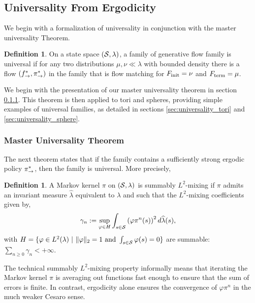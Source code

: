 \documentclass{article}
\theoremstyle{plain}
\theoremstyle{definition}
\newtheorem{definition}[theorem]{Definition}
\theoremstyle{remark}
\theoremstyle{fact}
\begin{document}
\subsection{Universality From Ergodicity}
\label{sec:universality}
We begin with a formalization of universality in conjunction with the master universality Theorem.
\begin{definition}
On a state space $(\mathcal S,\lambda)$, a family of generative flow family is 
universal if for any two distributions $\mu,\nu\ll \lambda$ with bounded density there is a flow $(f^*_{\rightarrow},\pi_{\rightarrow}^*)$ in the family that is flow matching for $F_{\mathrm{init}}=\nu$ and $F_{\mathrm{term}}=\mu$.
\end{definition}


We begin with the presentation of our master universality theorem in section \ref{sec:universality_master}. This theorem is then applied to tori and spheres, providing simple examples of universal families, as detailed in sections \ref{sec:universality_tori} and \ref{sec:universality_sphere}.


\subsubsection{Master Universality Theorem}
\label{sec:universality_master}
The next theorem states that if the family contains a sufficiently strong ergodic policy $\pi_{\rightarrow}^*$, then the family is universal. More precisely,
\begin{definition} A Markov kernel $\pi$ on $(\mathcal S,\lambda)$ is summably $L^2$-mixing if $\pi$ admits an invariant measure $\widehat \lambda$ equivalent to $\lambda$ and such that the $L^2$-mixing coefficients given by,
\begin{equation}
    \gamma_n := \sup_{\varphi \in H} \int_{s\in \mathcal S}
    \left(\varphi\pi^n(s)\right)^2 d\widehat \lambda(s), 
\end{equation}
with $H = \{\varphi \in L^2(\lambda)~|~\|\varphi\|_2 = 1 \text{ and } \int_{s\in \mathcal S} \varphi(s)=0\}$
are summable: $\sum_{n\geq 0} \gamma_n < +\infty$.
\end{definition}

The technical summably $L^2$-mixing property informally means that iterating the Markov kernel $\pi$ is averaging out functions fast enough to ensure that the sum of errors is finite. In contrast, ergodicity alone ensures the convergence of $\varphi \pi^n$ in the much weaker Cesaro sense.
\end{document}
